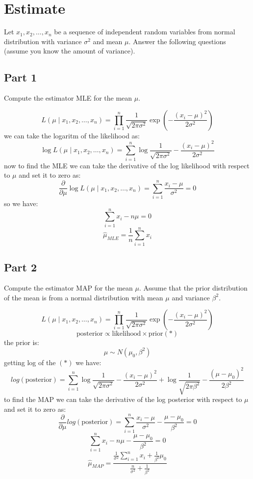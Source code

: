 \section{Estimate}

Let $x_1, x_2, \ldots, x_n$ be a sequence of independent random variables from normal distribution with variance $\sigma^2$ and mean $\mu$. Answer the following questions (assume you know the amount of variance).

\subsection{Part 1}
Compute the estimator MLE for the mean $\mu$.

\begin{qsolve}
	\begin{qsolve}[]
		$$
		L(\mu\mid x_1, x_2, \ldots, x_n) = \prod_{i=1}^{n} \frac{1}{\sqrt{2\pi\sigma^2}} \exp\left(-\frac{(x_i - \mu)^2}{2\sigma^2}\right)
		$$
		we can take the logaritm of the likelihood as:
		$$
		\log L(\mu\mid x_1, x_2, \ldots, x_n) = \sum_{i=1}^{n} \log \frac{1}{\sqrt{2\pi\sigma^2}} - \frac{(x_i - \mu)^2}{2\sigma^2}
		$$
		now to find the MLE we can take the derivative of the log likelihood with respect to $\mu$ and set it to zero as:
		$$
		\frac{\partial}{\partial \mu} \log L(\mu\mid x_1, x_2, \ldots, x_n) = \sum_{i=1}^{n} \frac{x_i - \mu}{\sigma^2} = 0
		$$
		so we have:
		$$
		\sum_{i=1}^{n} x_i - n\mu = 0
		$$
		$$
		\hat{\mu}_{MLE} = \frac{1}{n} \sum_{i=1}^{n} x_i
		$$
	\end{qsolve}
\end{qsolve}

\subsection{Part 2}
Compute the estimator MAP for the mean $\mu$. Assume that the prior distribution of the mean is from a normal distribution with mean $\mu$ and variance $\beta^2$.

\begin{qsolve}
	\begin{qsolve}[]
		$$
		L(\mu\mid x_1, x_2, \ldots, x_n) = \prod_{i=1}^{n} \frac{1}{\sqrt{2\pi\sigma^2}} \exp\left(-\frac{(x_i - \mu)^2}{2\sigma^2}\right)
		$$
		$$
		\text{posterior} \propto \text{likelihood} \times \text{prior} (\ast)
		$$
		the prior is:
		$$
		\mu \sim N(\mu_0, \beta^2)
		$$
		\splitqsolve[\splitqsolve]
		getting log of the $(\ast)$ we have:
		$$
		log(\text{posterior}) = \sum_{i=1}^{n} \log \frac{1}{\sqrt{2\pi\sigma^2}} - \frac{(x_i - \mu)^2}{2\sigma^2} + \log \frac{1}{\sqrt{2\pi\beta^2}} - \frac{(\mu - \mu_0)^2}{2\beta^2}
		$$
		to find the MAP we can take the derivative of the log posterior with respect to $\mu$ and set it to zero as:
		$$
		\frac{\partial}{\partial \mu} log(\text{posterior}) = \sum_{i=1}^{n} \frac{x_i - \mu}{\sigma^2} - \frac{\mu - \mu_0}{\beta^2} = 0
		$$
		$$
		\sum_{i=1}^{n} x_i - n\mu - \frac{\mu - \mu_0}{\beta^2} = 0
		$$
		$$
		\hat{\mu}_{MAP} = \frac{\frac{1}{\sigma^2} \sum_{i=1}^{n} x_i + \frac{1}{\beta^2} \mu_0}{\frac{n}{\sigma^2} + \frac{1}{\beta^2}}
		$$
	\end{qsolve}
\end{qsolve}

